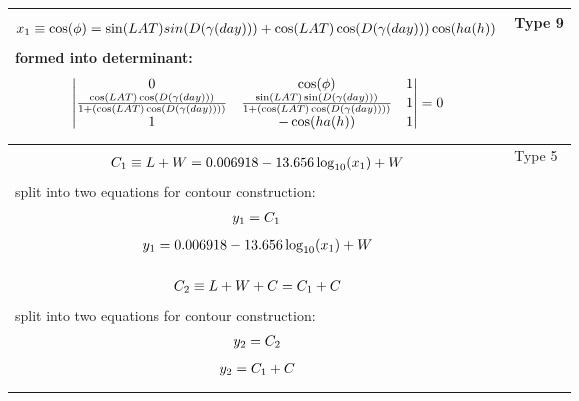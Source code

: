\documentclass[a4paper,11pt,english]{sphinxmanual}
\begin{document}
\begin{longtable}{|p{14cm}|p{2cm}|}
\begin{gather}
\begin{split}x_1 \equiv \cos(\phi)=\sin(LAT)sin(D(\gamma(day)))+\cos(LAT)\cos(D(\gamma(day)))\cos(ha(h))\,\end{split}\notag
\end{gather}
formed into determinant:
\begin{gather}
\begin{split}{
\begin{vmatrix}
        0  & \cos(\phi) & 1 \\
       \frac{\cos(LAT)\cos(D(\gamma(day)))}{1+(\cos(LAT)\cos(D(\gamma(day))))}  & \frac{\sin(LAT)\sin(D(\gamma(day)))}{1+(\cos(LAT)\cos(D(\gamma(day))))} & 1 \\
       1  & -\cos(ha(h)) & 1 \\
\end{vmatrix} = 0 }\end{split}\notag
\end{gather} & 
Type 9
\\
\hline\begin{gather}
\begin{split}C_1 \equiv L+W = 0.006918-13.656 \log_{10}(x_1)+W\end{split}\notag
\end{gather}
split into two equations for contour construction:
\begin{gather}
\begin{split}y_1 = C_1 \,\end{split}\notag
\end{gather}\begin{gather}
\begin{split}y_1 = 0.006918-13.656  \log_{10}(x_1)+W\end{split}\notag
\end{gather} & 
Type 5
\\
\hline\begin{gather}
\begin{split}C_2 \equiv L+W+C = C_1+C\end{split}\notag
\end{gather}
split into two equations for contour construction:
\begin{gather}
\begin{split}y_2 = C_2\end{split}\notag
\end{gather}\begin{gather}
\begin{split}y_2 = C_1+C\end{split}\notag

\end{gather}
\end{longtable}
\end{document}
